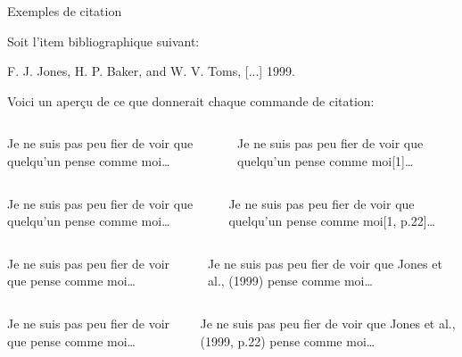 \begin{frame}[fragile]{Exemples de citation}
	
	Soit l'item bibliographique suivant:
\begin{codesource}
		F. J. Jones, H. P. Baker, and W. V. Toms, [...] 1999.
\end{codesource}

	Voici un aperçu de ce que donnerait chaque commande de citation:
	
	\pause
	
	\begin{columns}
		\vspace{-4.5mm}
\begin{codesource}
	Je ne suis pas peu fier de voir que quelqu'un
	pense comme moi\cite{jones99}\ldots
\end{codesource}
			Je ne suis pas peu fier de voir que quelqu'un
			pense comme moi[1]\ldots
	\end{columns}

	\begin{columns}
		\column{.49\textwidth}
		\vspace{-4.5mm}
\begin{codesource}
	Je ne suis pas peu fier de voir que quelqu'un
	pense comme moi\cite[p.22]{jones99}\ldots
\end{codesource}
		\column{.49\textwidth}
			Je ne suis pas peu fier de voir que quelqu'un
			pense comme moi[1, p.22]\ldots
		\end{columns}
	
	\pause

	\begin{columns}
		\vspace{-4.5mm}
\begin{codesource}
	Je ne suis pas peu fier de voir que 
	\citet{jones99}pense comme moi\ldots
\end{codesource}
			Je ne suis pas peu fier de voir que Jones et al., (1999) pense comme moi\ldots
		\end{columns}

		\begin{columns}
		\column{.49\textwidth}
		\vspace{-4.5mm}
\begin{codesource}
	Je ne suis pas peu fier de voir que 
	\citet[p.22]{jones99}pense comme moi\ldots
\end{codesource}
		\column{.49\textwidth}
			Je ne suis pas peu fier de voir que Jones et al., (1999, p.22) pense comme moi\ldots
		\end{columns}
	

\end{frame}
